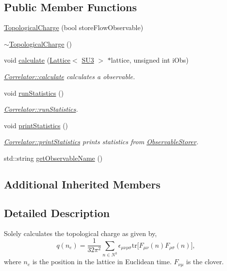 \subsection*{Public Member Functions}
\begin{DoxyCompactItemize}
\item 
\mbox{\hyperlink{class_topological_charge_a415e32f865f7b5c83f4ac4471838d514}{Topological\+Charge}} (bool store\+Flow\+Observable)
\item 
\mbox{\hyperlink{class_topological_charge_aec647c5c45f8532639cebcac10865f2e}{$\sim$\+Topological\+Charge}} ()
\item 
void \mbox{\hyperlink{class_topological_charge_a8ed78c28c3484df04b1cb24187de2f5b}{calculate}} (\mbox{\hyperlink{class_lattice}{Lattice}}$<$ \mbox{\hyperlink{class_s_u3}{S\+U3}} $>$ $\ast$lattice, unsigned int i\+Obs)
\begin{DoxyCompactList}\small\item\em \mbox{\hyperlink{class_correlator_ab33502ff305f891c5c2e6d66a26a0247}{Correlator\+::calculate}} calculates a observable. \end{DoxyCompactList}\item 
void \mbox{\hyperlink{class_topological_charge_ab9afadb9f37e638c0a168ebab5d41353}{run\+Statistics}} ()
\begin{DoxyCompactList}\small\item\em \mbox{\hyperlink{class_correlator_a35197b1d12b62ef30b79c0138a26456e}{Correlator\+::run\+Statistics}}. \end{DoxyCompactList}\item 
void \mbox{\hyperlink{class_topological_charge_ad56263921d283d315b04ab40c9594a2c}{print\+Statistics}} ()
\begin{DoxyCompactList}\small\item\em \mbox{\hyperlink{class_correlator_a2168d677f547769784781d2e2aaa53cf}{Correlator\+::print\+Statistics}} prints statistics from \mbox{\hyperlink{class_observable_storer}{Observable\+Storer}}. \end{DoxyCompactList}\item 
std\+::string \mbox{\hyperlink{class_topological_charge_ad12d246692f3d9ea0ef591814010ef88}{get\+Observable\+Name}} ()
\end{DoxyCompactItemize}
\subsection*{Additional Inherited Members}


\subsection{Detailed Description}
Solely calculates the topological charge as given by, \[ q(n_e) = \frac{1}{32\pi^2} \sum_{n \in N^3} \epsilon_{\mu\nu\rho\sigma} \mathrm{tr}\big[F_{\mu\nu}(n)F_{\rho\sigma}(n)\big], \] where $n_e$ is the position in the lattice in Euclidean time. $F_{\nu\mu}$ is the clover. 

